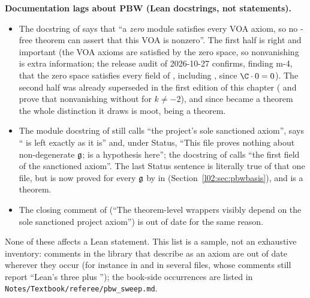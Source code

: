 \begin{warning}
\textbf{Documentation lags about PBW (Lean docstrings, not statements).}
\begin{itemize}
\item The docstring of  says that ``a \emph{zero} module
  satisfies every VOA axiom, so no -free theorem can assert that this VOA is nonzero''. The first
  half is right and important (the VOA axioms are satisfied by the zero space, so nonvanishing is extra
  information; the release audit of 2026-10-27 confirms, finding m-4, that the zero space satisfies every field of
  , including , since $\C\cdot 0 = 0$). The second half was already superseded in the first edition of this chapter
  (\allowbreak{}\allowbreak{}\allowbreak{} and \allowbreak{}\allowbreak{} prove
  that nonvanishing without  for $k\ne-2$), and since  became a theorem the whole distinction it draws
  is moot,  being a theorem.
\item The module docstring of  still calls  ``the
  project's sole sanctioned axiom'', says `` is left exactly as it is'' and, under Status,
  ``This file proves nothing about non-degenerate $\mathfrak{g}$;  is a hypothesis here''; the
  docstring of \allowbreak{}\allowbreak{} calls  ``the first field of the
  sanctioned axiom''. The last Status sentence is literally true of that one file, but  is
  now proved for every $\mathfrak{g}$ by  in 
  (Section~\ref{l02:sec:pbwbasis}), and  is a theorem.
\item The closing comment of  (``The theorem-level
  wrappers visibly depend on the sole sanctioned project axiom'') is out of date for the same reason.
\end{itemize}
None of these affects a Lean statement. This list is a sample, not an exhaustive inventory: comments in
the library that describe  as an axiom are out of date wherever they occur (for instance in
 and in several  files, whose comments still
report ``Lean's three plus ''); the book-side occurrences are listed in
\texttt{Notes/Textbook/referee/pbw\_sweep.md}.
\end{warning}

